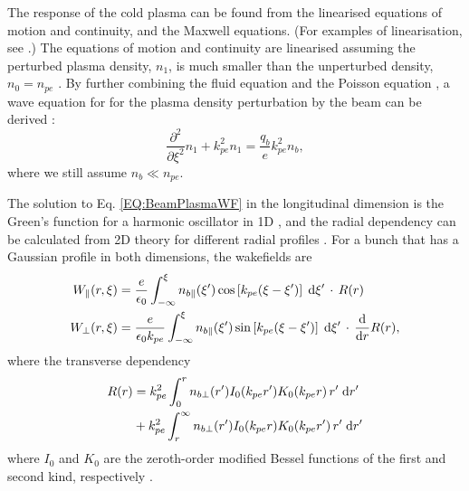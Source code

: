 The response of the cold plasma can be found from the linearised equations of motion and continuity, and the Maxwell equations. (For examples of linearisation, see \cite{pecseli:2012,chen:1974}.) The equations of motion and continuity are linearised assuming the perturbed plasma density, $n_{1}$, is much smaller than the unperturbed density, $n_{0} = n_{pe}$ \cite{chen:1987}. By further combining the fluid equation and the Poisson equation \cite{katsouleas:1987}, a wave equation for for the plasma density perturbation by the beam can be derived \cite{chen:1987,muggli:2017}:
\begin{equation}
    \frac{\partial^{2}}{\partial\xi^{2}}n_{1} + k_{pe}^{2}n_{1} = \frac{q_{b}}{e}k_{pe}^{2}n_{b}, \label{EQ:BeamPlasmaWF}
\end{equation}
where we still assume $n_{b} \ll n_{pe}$.

The solution to Eq. \ref{EQ:BeamPlasmaWF} in the longitudinal dimension is the Green’s function for a harmonic oscillator in 1D \cite{katsouleas:1987}, and the radial dependency can be calculated from 2D theory for different radial profiles \cite{chen:1987}. For a bunch that has a Gaussian profile in both dimensions, the wakefields are
\begin{align}
    W_{\parallel}(r,\xi) &= \frac{e}{\epsilon_{0}}
        \int_{-\infty}^{\xi} n_{b\parallel}(\xi^{\prime}) \cos\left[k_{pe}(\xi-\xi^{\prime})\right] \;\mathrm{d}\xi^{\prime} \,\cdot\, R(r) \label{EQ:WzFull} \\
    W_{\perp}(r,\xi) &= \frac{e}{\epsilon_{0}k_{pe}}
        \int_{-\infty}^{\xi} n_{b\parallel}(\xi^{\prime}) \sin\left[k_{pe}(\xi-\xi^{\prime})\right] \;\mathrm{d}\xi^{\prime} \,\cdot\, \frac{\mathrm{d}}{\mathrm{d}r}R(r), \label{EQ:WrFull}
\end{align}
where the transverse dependency
\begin{align}
    R(r) &= k_{pe}^{2} \int_{0}^{r} n_{b\perp}(r^{\prime}) I_{0}(k_{pe}r^{\prime})
           K_{0}(k_{pe}r) \,r^{\prime}\;\mathrm{d}r^{\prime} \nonumber \\
         &+ k_{pe}^{2} \int_{r}^{\infty} n_{b\perp}(r^{\prime}) I_{0}(k_{pe}r)
           K_{0}(k_{pe}r^{\prime}) \,r^{\prime}\;\mathrm{d}r^{\prime} \label{EQ:WFRadial}
\end{align}
where $I_{0}$ and $K_{0}$ are the zeroth-order modified Bessel functions of the first and second kind, respectively \cite{chen:1987,muggli:2017}.


